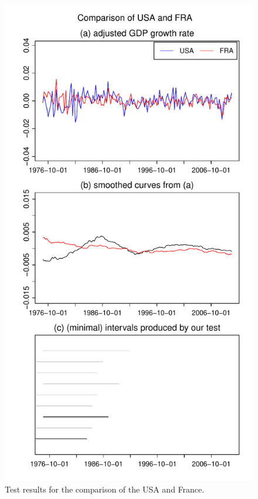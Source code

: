 \documentclass[a4paper,12pt]{article}
\begin{document}
\begin{figure}[p!]
\begin{minipage}[t]{0.49\textwidth}
\includegraphics[width=\textwidth]{output/plots/gdp/USA_vs_FRA}
\caption{Test results for the comparison of the USA and France.}\label{fig:USA:France}
\end{minipage}
\hspace{0.25cm}

\end{figure}
\end{document}
